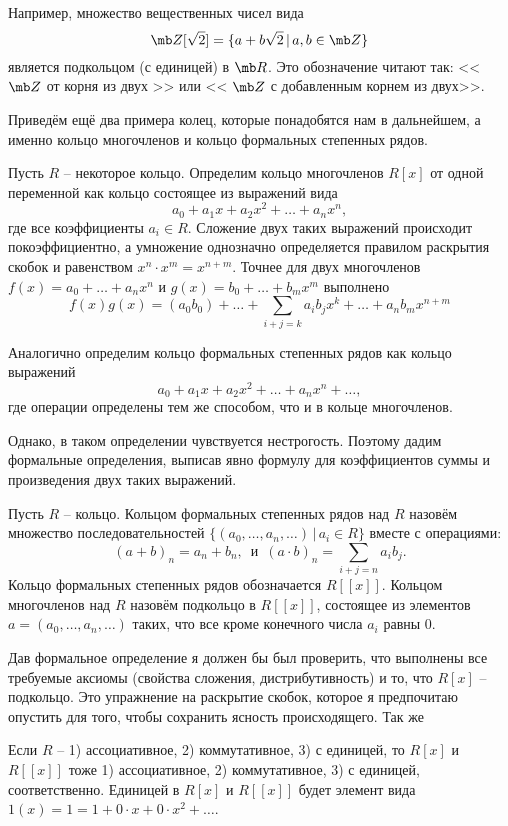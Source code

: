 \rm Например, множество вещественных чисел вида 
$$\mb Z[\sqrt{2}]=\{a+b\sqrt{2}\,|\, a,b \in \mb Z\} $$
является подкольцом (с единицей) в $\mb R$. Это обозначение читают так: << $\mb Z$ от корня из двух >> или << $\mb Z$ с добавленным корнем из двух>>. 
\erm




Приведём ещё два примера колец, которые понадобятся нам в дальнейшем, а именно кольцо многочленов и кольцо
формальных степенных рядов.



 Пусть $R$ – некоторое кольцо. Определим кольцо многочленов $R[x]$ от
одной переменной как кольцо состоящее из выражений вида
$$a_0+a_1x+a_2x^2+\dots+a_nx^n,$$
где все коэффициенты $a_i\in R$. Сложение двух таких выражений происходит покоэффициентно, а умножение однозначно определяется правилом раскрытия скобок и равенством $x^n\cdot x^m=x^{n+m}.$ Точнее для двух многочленов $f(x)=a_0+\dots+a_nx^n$ и $g(x)=b_0+\dots+b_mx^m$ выполнено
$$f(x)g(x)= (a_0b_0)+ \dots+\sum_{i+j=k}a_ib_j x^k+\dots+a_nb_mx^{n+m}$$
\edfn

 Аналогично определим кольцо формальных степенных рядов как кольцо выражений
$$a_0+a_1x+a_2x^2+\dots+a_nx^n+\dots,$$
где операции определены тем же способом, что и в кольце многочленов.
\edfn

Однако, в таком определении чувствуется нестрогость. Поэтому дадим формальные определения, выписав явно формулу для коэффициентов суммы и произведения двух таких выражений.

 Пусть $R$ -- кольцо. Кольцом формальных степенных рядов над $R$ назовём множество последовательностей $\{(a_0,\dots,a_n, \dots)\,|\, a_i\in R\}$ вместе с операциями:
$$ (a+b)_n=a_n+b_n, \, \text{ и } \, (a\cdot b)_n=\sum_{i+j=n}a_ib_j.$$
Кольцо формальных степенных рядов обозначается $R[[x]]$. Кольцом многочленов над $R$ назовём подкольцо в $R[[x]]$,
состоящее из элементов $a=(a_0,\dots,a_n,\dots)$ таких, что все кроме конечного числа $a_i$ равны $0$.
\edfn

Дав формальное определение я должен бы был проверить, что выполнены все требуемые аксиомы (свойства сложения, дистрибутивность) и то, что $R[x]$ -- подкольцо. Это упражнение на раскрытие скобок, которое я предпочитаю опустить для того, чтобы сохранить ясность происходящего. Так же

\rm Если $R$ -- 1) ассоциативное, 2) коммутативное, 3) с единицей, то $R[x]$ и $R[[x]]$ тоже 1) ассоциативное, 2) коммутативное, 3) с единицей, соответственно.
Единицей в $R[x]$ и $R[[x]]$ будет элемент вида $1(x)=1=1+0\cdot x+0\cdot x^2+\dots$.
\erm


